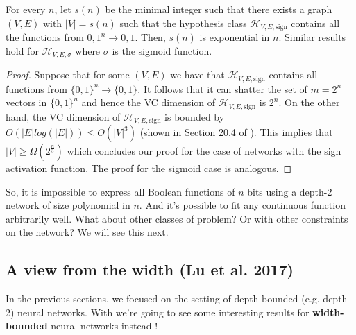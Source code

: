 \documentclass{article}
\begin{document}
\begin{thm}
\label{thm:exponential}
For every $n$, let $s(n)$ be the minimal integer such that there exists a graph $(V, E)$ with $|V| = s(n)$ such that the hypothesis class $\mathcal{H}_{V,E,\text{sign}}$ contains all the functions from ${0, 1}^n \to {0, 1}$. Then, $s(n)$ is exponential in $n$. Similar results hold for $\mathcal{H}_{V,E,\sigma}$ where $\sigma$ is the sigmoid function.
\end{thm}

\begin{proof}
Suppose that for some $(V, E)$ we have that $\mathcal{H}_{V, E, \text{sign}}$ contains all functions from $\{0, 1\}^n \to \{0, 1\}$. It follows that it can shatter the set of $m = 2^n$ vectors in $\{0, 1\}^n$ and hence the VC dimension of $\mathcal{H}_{V, E, \text{sign}}$ is $2^n$. On the other hand, the VC dimension of $\mathcal{H}_{V, E, \text{sign}}$ is bounded by $O(|E|log(|E|)) \leq O(|V|^3)$ (shown in Section 20.4 of \citep{Shalev-Shwartz:2014:UML:2621980}). This implies that $|V| \geq \Omega(2^{\frac{n}{3}})$ which concludes our proof for the case of networks with the sign activation function. The proof for the sigmoid case is analogous.
\end{proof}

So, it is impossible to express all Boolean functions of $n$ bits using a depth-2 network of size polynomial in $n$. And it's possible to fit any continuous function arbitrarily well. What about other classes of problem? Or with other constraints on the network? We will see this next.


\vspace{5mm}


\subsection{A view from the width (Lu et al. 2017)}
In the previous sections, we focused on the setting of depth-bounded (e.g. depth-2) neural networks. With \cite{lu2017expressive} we're going to see some interesting results for \textbf{width-bounded} neural networks instead !
\end{document}

